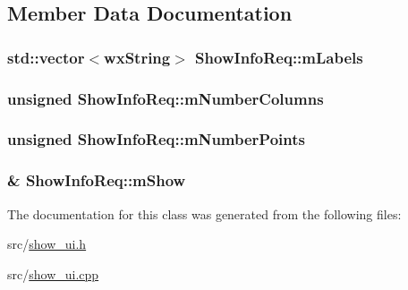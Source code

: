 \subsection{Member Data Documentation}
\hypertarget{a00138_a2de4d128d3baee474a84997bd07c89ec}{
\subsubsection[{m\-Labels}]{\setlength{\rightskip}{0pt plus 5cm}std\-::vector$<$wx\-String$>$ Show\-Info\-Req\-::m\-Labels\hspace{0.3cm}{\ttfamily [private]}}}\label{a00138_a2de4d128d3baee474a84997bd07c89ec}
\hypertarget{a00138_a78df8c808115d12b0c618ee21275f196}{
\subsubsection[{m\-Number\-Columns}]{\setlength{\rightskip}{0pt plus 5cm}unsigned Show\-Info\-Req\-::m\-Number\-Columns\hspace{0.3cm}{\ttfamily [private]}}}\label{a00138_a78df8c808115d12b0c618ee21275f196}
\hypertarget{a00138_a1f2e5835094435c7f7e3f4ed7b174bdc}{
\subsubsection[{m\-Number\-Points}]{\setlength{\rightskip}{0pt plus 5cm}unsigned Show\-Info\-Req\-::m\-Number\-Points\hspace{0.3cm}{\ttfamily [private]}}}\label{a00138_a1f2e5835094435c7f7e3f4ed7b174bdc}
\hypertarget{a00138_a44069d1b1d7101727e165fc98770faa9}{
\subsubsection[{m\-Show}]{\& Show\-Info\-Req\-::m\-Show\hspace{0.3cm}{\ttfamily [private]}}}\label{a00138_a44069d1b1d7101727e165fc98770faa9}


The documentation for this class was generated from the following files\-:\begin{DoxyCompactItemize}
\item 
src/\hyperlink{a00245}{show\-\_\-ui.\-h}\item 
src/\hyperlink{a00244}{show\-\_\-ui.\-cpp}\end{DoxyCompactItemize}
